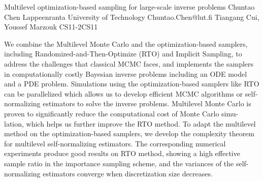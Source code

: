 \begin{talk}
 {Multilevel optimization-based sampling for large-scale inverse problems}%
  {Chuntao Chen}%
  {Lappeenranta University of Technology}%
  {Chuntao.Chen@lut.fi}%
  {Tiangang Cui, Youssef Marzouk}%
{}{}{CS11-2}{CS11}

			
We combine the Multilevel Monte Carlo and the optimization-based samplers, including Randomized-and-Then-Optimize (RTO) and Implicit Sampling, to address the challenges that classical MCMC faces, and implements the samplers in computationally costly Bayesian inverse problems including an ODE model and a PDE problem. Simulations using the optimization-based samplers like RTO can be parallelized which allows us to develop efficient
MCMC algorithms or self-normalizing estimators to solve the inverse problems. Multilevel Monte Carlo is proven to significantly reduce the computational cost of Monte Carlo simu-
lation, which helps us further improve the RTO method. To adapt the multilevel method on the optimization-based samplers, we develop the complexity theorem for multilevel self-normalizing estimators. The corresponding numerical experiments produce good results on RTO method, showing a high effective sample ratio in the importance sampling scheme, and the variances of the self-normalizing estimators converge when discretization size decreases.


\medskip




\end{talk}

